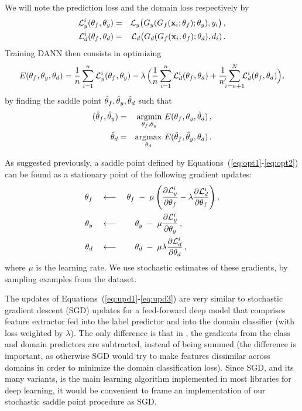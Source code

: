We will note the prediction loss and the domain loss respectively by
\begin{eqnarray*}
{\mathcal{L}}_y^i({\theta_f}, {\theta_y})&=& {\mathcal{L}}_{y} \big( G_y(G_f({\mathbf x}_i; {\theta_f}); {\theta_y}), y_i\big)\,,\\ 
{\mathcal{L}}_{d}^i({\theta_f}, {\theta_d})&=& {\mathcal{L}}_{d} \big( G_d(G_f({\mathbf x}_i; {\theta_f}); {\theta_d}), d_i)\,.
\end{eqnarray*}
Training DANN then consists in optimizing
\begin{eqnarray}
E (\tf,\ty,\td)
= \frac{1}{n}\sum_{i=1}^n \Lcal_y^i(\tf,\ty)
- \lambda \,\Big(\frac{1}{n} \sum_{i=1}^{n} \Lcal_{d}^i(\tf, \td)  + \frac{1}{n'} \sum_{\mathclap{i=n+1}}^{N} \Lcal_{d}^i(\tf, \td )\Big),
\label{eqn:global_gen}
\end{eqnarray}
by finding the saddle point ${\hat\theta_f},{\hat\theta_y},{\hat\theta_d}$ such that
\begin{eqnarray}
({\hat\theta_f},{\hat\theta_y}) &=& \operatorname*{\mathrm{argmin}}_{{\theta_f},{\theta_y}}\, E({\theta_f},{\theta_y},{\hat\theta_d})\,,\label{eq:opt1}\\\label{eq:opt2}
{\hat\theta_d} &=& \operatorname*{\mathrm{argmax}}_{\theta_d} \, E({\hat\theta_f},{\hat\theta_y}, {\theta_d})\,.
\end{eqnarray}




As suggested previously, a saddle point defined by Equations~(\ref{eq:opt1}-\ref{eq:opt2}) can be found as a stationary point of the following gradient updates:
{\allowdisplaybreaks[4]
\begin{align}
{\theta_f} \quad &\longleftarrow \quad {\theta_f} \;-\; \mu \left(\frac{\partial {\mathcal{L}}_y^i}{\partial {\theta_f}}-\lambda\frac{\partial {\mathcal{L}}_d^i}{\partial {\theta_f}} \right), \label{eq:upd1}\\
{\theta_y} \quad &\longleftarrow \qquad {\theta_y} \;-\; \mu \frac{\partial {\mathcal{L}}_y^i}{\partial {\theta_y}}\,,\label{eq:upd2}\\
{\theta_d} \quad &\longleftarrow \qquad {\theta_d} \;-\; \mu \lambda \frac{\partial {\mathcal{L}}_d^i}{\partial {\theta_d}}\,, \label{eq:upd3}
\end{align}
}where $\mu$ is the learning rate. We use stochastic estimates of these gradients, by sampling examples from the dataset.

The updates of Equations~(\ref{eq:upd1}-\ref{eq:upd3}) are very similar to stochastic gradient descent (SGD) updates for a feed-forward deep model that comprises feature extractor fed into the label predictor and into the domain classifier (with loss weighted by $\lambda$). The only difference is that in , the gradients from the class and domain predictors are subtracted, instead of being summed (the difference is important, as otherwise SGD would try to make features dissimilar across domains in order to minimize the domain classification loss). Since SGD, and its many variants, is the main learning algorithm implemented in most libraries for deep learning, it would be convenient to frame an implementation of our stochastic saddle point procedure as SGD.

